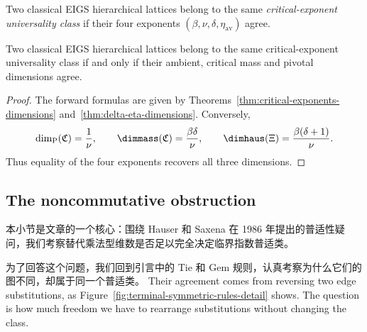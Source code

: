 \begin{definition}\label{def:general-class}
Two classical EIGS hierarchical lattices belong to the same \emph{critical-exponent universality class} if their four exponents $(\beta,\nu,\delta,\eta_{\mathrm{av}})$ agree.
\end{definition}

\begin{theorem}\label{thm:exponent-class-dimensions}\label{def:static-class}
Two classical EIGS hierarchical lattices belong to the same critical-exponent universality class if and only if their ambient, critical mass and pivotal dimensions agree.
\end{theorem}
\begin{proof}
The forward formulas are given by Theorems~\ref{thm:critical-exponents-dimensions} and~\ref{thm:delta-eta-dimensions}.
Conversely,
\[
 \dim_{\mathrm P}(\mathfrak C)=\frac1\nu,\qquad
 \dimmass(\mathfrak C)=\frac{\beta\delta}{\nu},\qquad
 \dimhaus(\Xi)=\frac{\beta(\delta+1)}{\nu}.
\]
Thus equality of the four exponents recovers all three dimensions.
\end{proof}


\subsection{The noncommutative obstruction}\label{sec:noncommuting}\label{sec:forward}


本小节是文章的一个核心：围绕 Hauser 和 Saxena 在 1986 年提出的普适性疑问，我们考察替代乘法型维数是否足以完全决定临界指数普适类。


为了回答这个问题，我们回到引言中的 Tie 和 Gem 规则，认真考察为什么它们的图不同，却属于同一个普适类。
Their agreement comes from reversing two edge substitutions, as Figure~\ref{fig:terminal-symmetric-rules-detail} shows.
The question is how much freedom we have to rearrange substitutions without changing the class.

